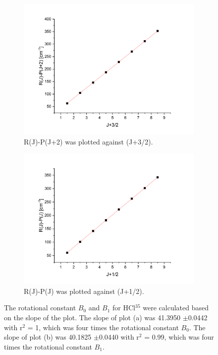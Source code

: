 \documentclass[twocolumn]{article} %
\begin{document}
\begin{figure}[h!]
    \begin{subfigure}[b]{0.95\columnwidth}
        \includegraphics[width=\columnwidth]{HCl-35-B0.png}
        \caption{R(J)-P(J+2) was plotted against (J+3/2).}
        \label{fig:sfig1}
    \end{subfigure}
    \begin{subfigure}[b]{0.95\columnwidth}
      \includegraphics[width=\columnwidth]{HCl-35-B1.png}
      \caption{R(J)-P(J) was plotted against (J+1/2).}
      \label{fig:sfig2}
    \end{subfigure}
    \caption{The rotational constant $B_0$ and $B_1$ for HCl$^{35}$ were calculated based on the slope of the plot. The slope of plot (a) was 41.3950 $\pm$0.0442 with r$^2$ = 1, which was four times the rotational constant $B_0$. The slope of plot (b) was 40.1825 $\pm$0.0440 with r$^2$ = 0.99, which was four times the rotational constant $B_1$.}
\end{figure}
\end{document}
